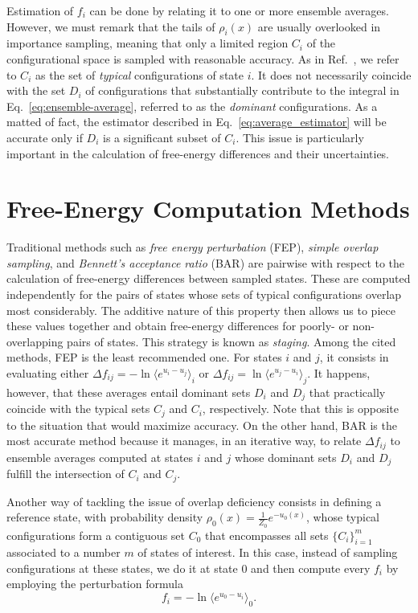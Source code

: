 \documentclass[aip,jcp,preprint,amsmath,amssymb]{revtex4-1}
\begin{document}
Estimation of $f_i$ can be done by relating it to one or more ensemble averages. However, we must remark that the tails of $\rho_i(x)$ are usually overlooked in importance sampling, meaning that only a limited region $C_i$ of the configurational space is sampled with reasonable accuracy. As in Ref.~, we refer to $C_i$ as the set of \textit{typical} configurations of state $i$. It does not necessarily coincide with the set $D_i$ of configurations that substantially contribute to the integral in Eq.~\eqref{eq:ensemble-average}, referred to as the \textit{dominant} configurations. As a matted of fact, the estimator described in Eq.~\eqref{eq:average_estimator} will be accurate only if $D_i$ is a significant subset of $C_i$. This issue is particularly important in the calculation of free-energy differences and their uncertainties.

\section{Free-Energy Computation Methods}

Traditional methods such as \textit{free energy perturbation} (FEP),\cite{Zwanzig_1954} \textit{simple overlap sampling},\cite{Lee_1980, Lu_2003} and \textit{Bennett's acceptance ratio} (BAR)\cite{Bennett_1976} are pairwise with respect to the calculation of free-energy differences between sampled states. These are computed independently for the pairs of states whose sets of typical configurations overlap most considerably. The additive nature of this property then allows us to piece these values together and obtain free-energy differences for poorly- or non-overlapping pairs of states. This strategy is known as \textit{staging}.\cite{Kofke_1998} Among the cited methods, FEP is the least recommended one. For states $i$ and $j$, it consists in evaluating either $\Delta f_{ij} = -\ln \langle e^{u_i - u_j} \rangle_i$ or $\Delta f_{ij} = \ln \langle e^{u_j - u_i} \rangle_j$.\cite{Zwanzig_1954} It happens, however, that these averages entail dominant sets $D_i$ and $D_j$ that practically coincide with the typical sets $C_j$ and $C_i$, respectively.\cite{Jarzynski_2006} Note that this is opposite to the situation that would maximize accuracy. On the other hand, BAR is the most accurate method because it manages, in an iterative way, to relate $\Delta f_{ij}$ to ensemble averages computed at states $i$ and $j$ whose dominant sets $D_i$ and $D_j$ fulfill the intersection of $C_i$ and $C_j$.

Another way of tackling the issue of overlap deficiency consists in defining a reference state, with probability density $\rho_0(x) = \frac{1}{Z_0}e^{-u_0(x)}$, whose typical configurations form a contiguous set $C_0$ that encompasses all sets $\{C_i\}_{i=1}^m$ associated to a number $m$ of states of interest. In this case, instead of sampling configurations at these states, we do it at state $0$ and then compute every $f_i$ by employing the perturbation formula
\begin{equation}
\label{eq:umbrella sampling free energy}
f_i = -\ln \langle e^{u_0-u_i} \rangle_0.
\end{equation}
\end{document}
